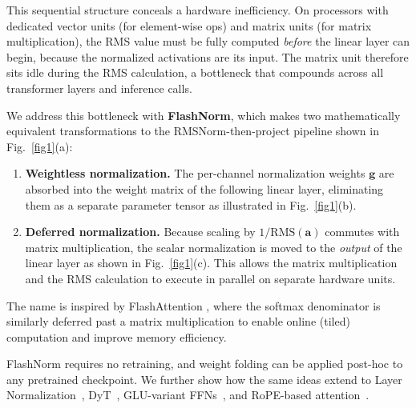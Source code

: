 \documentclass{article}
\begin{document}
This sequential structure conceals a hardware inefficiency. On processors with
dedicated vector units (for element-wise ops) and matrix units (for matrix multiplication), the
RMS value must be fully computed \emph{before} the linear layer can begin, because
the normalized activations are its input. The matrix unit therefore sits idle during
the RMS calculation, a bottleneck that compounds across all transformer layers and inference calls.

We address this bottleneck with \textbf{FlashNorm}, which makes two
mathematically equivalent transformations to the RMSNorm-then-project pipeline shown in
Fig.~\ref{fig1}(a):

\begin{enumerate}
  \item \textbf{Weightless normalization.} The per-channel normalization weights
        $\mathbf{g}$ are absorbed into the weight matrix of the following linear layer,
        eliminating them as a separate parameter tensor as illustrated in Fig.~\ref{fig1}(b).
  \item \textbf{Deferred normalization.} Because scaling by $1/\mathrm{RMS}(\mathbf{a})$
        commutes with matrix multiplication, the scalar normalization is
        moved to the \emph{output} of the linear layer as shown in Fig.~\ref{fig1}(c).
        This allows the matrix multiplication and the RMS calculation to execute in parallel on separate
        hardware units.
\end{enumerate}

The name is inspired by FlashAttention \citep{flash-attention}, where the
softmax denominator is similarly deferred past a matrix multiplication to enable
online (tiled) computation and improve memory efficiency.

FlashNorm requires no retraining, and weight folding can be applied post-hoc to any pretrained
checkpoint. We further show how the same ideas extend to Layer Normalization~\citep{layerNorm},
DyT~\citep{DyT}, GLU-variant FFNs~\citep{GLU}, and RoPE-based attention~\citep{RoPE}.
\end{document}
